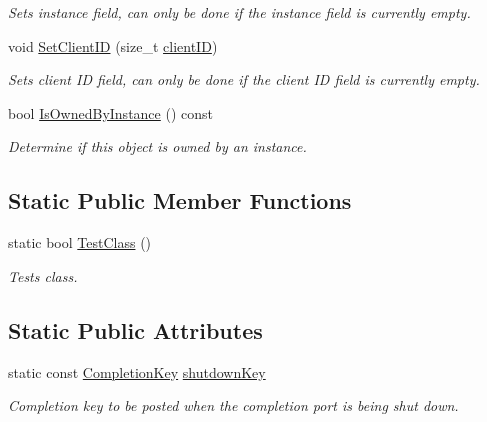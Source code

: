 \begin{DoxyCompactItemize}
\begin{DoxyCompactList}\small\item\em Sets instance field, can only be done if the instance field is currently empty. \item\end{DoxyCompactList}\item 
void \hyperlink{class_completion_key_a03d3896b9cb138783b865f3f4f7fb6ac}{SetClientID} (size\_\-t \hyperlink{class_completion_key_ae434a173023d23d9cc22b131509d0325}{clientID})
\begin{DoxyCompactList}\small\item\em Sets client ID field, can only be done if the client ID field is currently empty. \item\end{DoxyCompactList}\item 
bool \hyperlink{class_completion_key_a1b8ca558f20c99ee689c39d4cae281ae}{IsOwnedByInstance} () const 
\begin{DoxyCompactList}\small\item\em Determine if this object is owned by an instance. \item\end{DoxyCompactList}\end{DoxyCompactItemize}
\subsection*{Static Public Member Functions}
\begin{DoxyCompactItemize}
\item 
static bool \hyperlink{class_completion_key_a99f9ec1d20ab8a952222176345a7b065}{TestClass} ()
\begin{DoxyCompactList}\small\item\em Tests class. \item\end{DoxyCompactList}\end{DoxyCompactItemize}
\subsection*{Static Public Attributes}
\begin{DoxyCompactItemize}
\item 
\hypertarget{class_completion_key_a77abe450afe2bee29fca1046b3973e69}{
static const \hyperlink{class_completion_key}{CompletionKey} \hyperlink{class_completion_key_a77abe450afe2bee29fca1046b3973e69}{shutdownKey}}
\label{class_completion_key_a77abe450afe2bee29fca1046b3973e69}

\begin{DoxyCompactList}\small\item\em Completion key to be posted when the completion port is being shut down. \item\end{DoxyCompactList}\end{DoxyCompactItemize}
